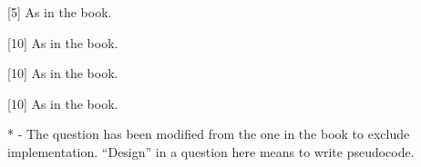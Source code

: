 \documentclass[addpoints]{exam}
\begin{document}
\begin{questions}
[5]
As in the book.
\begin{solution}
\end{solution}


[10]
As in the book.
\begin{solution}
\end{solution}

[10]
As in the book.
\begin{solution}
\end{solution}

[10]
As in the book.
\begin{solution}
\end{solution}
\end{questions}

* - The question has been modified from the one in the book to exclude implementation. ``Design'' in a question here means to write pseudocode.
\end{document}

